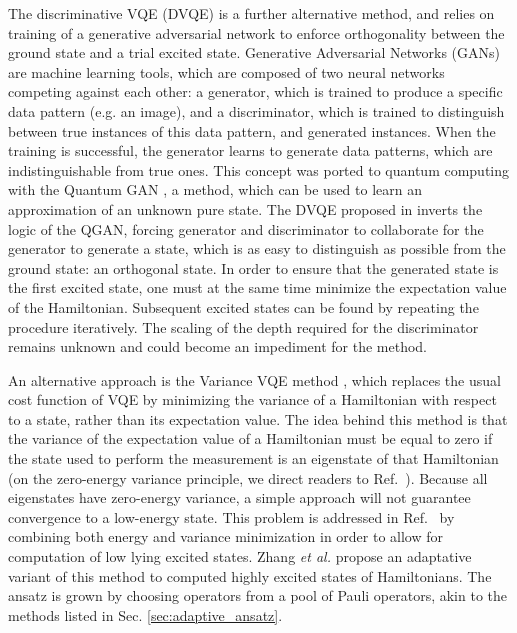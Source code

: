 The discriminative VQE (DVQE) \cite{Tilly2020} is a further alternative method, and relies on training of a generative adversarial network to enforce orthogonality between the ground state and a trial excited state. Generative Adversarial Networks (GANs) are machine learning tools, which are composed of two neural networks competing against each other: a generator, which is trained to produce a specific data pattern (e.g. an image), and a discriminator, which is trained to distinguish between true instances of this data pattern, and generated instances. When the training is successful, the generator learns to generate data patterns, which are indistinguishable from true ones. This concept was ported to quantum computing with the Quantum GAN \cite{Lloyd2018, Benedetti2019}, a method, which can be used to learn an approximation of an unknown pure state. The DVQE proposed in \cite{Tilly2020} inverts the logic of the QGAN, forcing generator and discriminator to collaborate for the generator to generate a state, which is as easy to distinguish as possible from the ground state: an orthogonal state. In order to ensure that the generated state is the first excited state, one must at the same time minimize the expectation value of the Hamiltonian. Subsequent excited states can be found by repeating the procedure iteratively. The scaling of the depth required for the discriminator remains unknown and could become an impediment for the method.

An alternative approach is the Variance VQE method \cite{zhang2020variance_minimization}, which replaces the usual cost function of VQE by minimizing the variance of a Hamiltonian with respect to a state, rather than its expectation value. The idea behind this method is that the variance of the expectation value of a Hamiltonian must be equal to zero if the state used to perform the measurement is an eigenstate of that Hamiltonian (on the zero-energy variance principle, we direct readers to Ref.~\cite{Bartlett1935, Siringo2005, Umrigar2005, Khemani2016, Pollmann2016, Vicentini2019}). Because all eigenstates have zero-energy variance, a simple approach will not guarantee convergence to a low-energy state. This problem is addressed in Ref.~ \cite{zhang2020variance_minimization} by combining both energy and variance minimization in order to allow for computation of low lying excited states. Zhang \textit{et al.} \cite{zhangAdaptiveVariationalQuantum2021} propose an adaptative variant of this method to computed highly excited states of Hamiltonians. The ansatz is grown by choosing operators from a pool of Pauli operators, akin to the methods listed in Sec. \ref{sec:adaptive_ansatz}.

